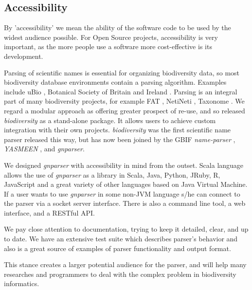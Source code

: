 \documentclass{bmcart}
\begin{document}
\subsection*{Accessibility}

By 'accessibility' we mean the ability of the software code to be used by the widest
audience possible. For Open Source projects, accessibility is very important,
as the more people use a software more cost-effective is its development.


Parsing of scientific names is essential for organizing biodiversity data, so most biodiversity database environments 
contain a parsing algorithm.  Examples include  uBio
\cite{ubio:parser}, Botanical Society of Britain and Ireland
\cite{botsociety:parser}.  Parsing is an integral part of many biodiversity
projects, for example FAT \cite{Sautter2006}, NetiNeti \cite{Akella2012},
Taxonome \cite{Kluyver2013}. We regard a modular approach as offering greater prospect of re-use, and so  released
\textit{biodiversity} \cite{Boyle2013} as a stand-alone package.  It allows
 users to achieve custom integration  with their own projects. 
\textit{biodiversity} was the first scientific name parser released this way, but has now been joined by the GBIF \textit{name-parser} \cite{gbifNameParser}, \textit{YASMEEN}
\cite{VandenBerghe2015}, and \textit{gnparser}.

We designed \textit{gnparser} with accessibility in mind from the outset. Scala
language allows the use of \textit{gnparser} as a library in Scala, Java,
Python, JRuby, R, JavaScript and a great variety of other languages based on
Java Virtual Machine. If a user wants to use \textit{gnparser}  in some non-JVM language s/he
can connect to the parser via a socket server interface. There is also a
command line tool, a web interface, and a RESTful API.

We pay close attention to documentation, trying to keep it detailed, clear, and
up to date. We have an extensive test suite which describes parser's behavior
and also is a great source of examples of parser  functionality and output
format.

This stance creates a larger potential audience for the parser, and will help many
researches and programmers to deal with the complex problem in biodiversity
informatics.
\end{document}
